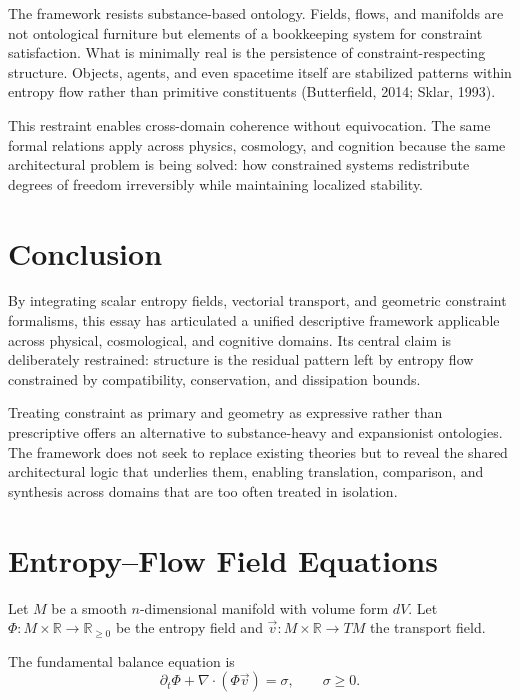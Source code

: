 \documentclass[11pt]{article}
\begin{document}
The framework resists substance-based ontology. Fields, flows, and manifolds are not ontological furniture but elements of a bookkeeping system for constraint satisfaction. What is minimally real is the persistence of constraint-respecting structure. Objects, agents, and even spacetime itself are stabilized patterns within entropy flow rather than primitive constituents (Butterfield, 2014; Sklar, 1993).

This restraint enables cross-domain coherence without equivocation. The same formal relations apply across physics, cosmology, and cognition because the same architectural problem is being solved: how constrained systems redistribute degrees of freedom irreversibly while maintaining localized stability.

\section{Conclusion}

By integrating scalar entropy fields, vectorial transport, and geometric constraint formalisms, this essay has articulated a unified descriptive framework applicable across physical, cosmological, and cognitive domains. Its central claim is deliberately restrained: structure is the residual pattern left by entropy flow constrained by compatibility, conservation, and dissipation bounds.

Treating constraint as primary and geometry as expressive rather than prescriptive offers an alternative to substance-heavy and expansionist ontologies. The framework does not seek to replace existing theories but to reveal the shared architectural logic that underlies them, enabling translation, comparison, and synthesis across domains that are too often treated in isolation.

\appendix
\section{Entropy--Flow Field Equations}

Let $M$ be a smooth $n$-dimensional manifold with volume form $dV$.  
Let $\Phi : M \times \mathbb{R} \to \mathbb{R}_{\ge 0}$ be the entropy field and  
$\vec{v} : M \times \mathbb{R} \to TM$ the transport field.

The fundamental balance equation is
\begin{equation}
\partial_t \Phi + \nabla \cdot (\Phi \vec{v}) = \sigma,
\qquad
\sigma \ge 0.
\end{equation}
\end{document}
